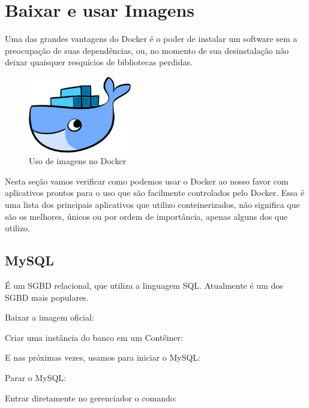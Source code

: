 \documentclass[a4paper,11pt]{article}
\begin{document}
\section{Baixar e usar Imagens}
Uma das grandes vantagens do Docker é o poder de instalar um software sem a preocupação de suas dependências, ou, no momento de sua desinstalação não deixar quaisquer resquícios de bibliotecas perdidas.
\begin{figure}[H]
	\centering
	\includegraphics[width=0.4\textwidth]{imagem/whale-docker-logo.png}
	\caption{Uso de imagens no Docker}
\end{figure}

Nesta seção vamos verificar como podemos usar o Docker ao nosso favor com aplicativos prontos para o uso que são facilmente controlados pelo Docker. Essa é uma lista dos principais aplicativos que utilizo conteinerizados, não significa que são os melhores, únicos ou por ordem de importância, apenas alguns dos que utilizo.

\subsection{MySQL}
É um SGBD relacional, que utiliza a linguagem SQL. Atualmente é um dos SGBD mais populares. 

Baixar a imagem oficial: \\

Criar uma instância do banco em um Contêiner: \\

E nas próximas vezes, usamos para iniciar o MySQL: \\

Parar o MySQL: \\

Entrar diretamente no gerenciador o comando: \\
\end{document}
